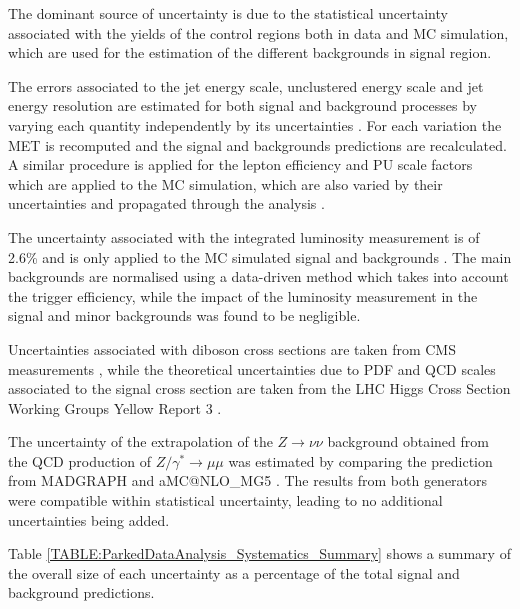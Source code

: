 
The dominant source of uncertainty is due to the statistical uncertainty associated with the yields of the control regions both in data and \gls{MC} simulation, which are used for the estimation of the different backgrounds in signal region. 

The errors associated to the jet energy scale, unclustered energy scale and jet energy resolution are estimated for both signal and background processes by varying each quantity independently by its uncertainties \cite{ARTICLE:CMSDeterminationJetEnergyCalibration}. For each variation the \gls{MET} is recomputed and the signal and backgrounds predictions are recalculated. A similar procedure is applied for the lepton efficiency and \gls{PU} scale factors which are applied to the \gls{MC} simulation, which are also varied by their uncertainties and propagated through the analysis \cite{ARTICLE:CMSMuonReconstruction7TeV,ARTICLE:CMSElectronReconstruction8TeV}.

The uncertainty associated with the integrated luminosity measurement is of 2.6\% and is only applied to the \gls{MC} simulated signal and backgrounds \cite{ARTICLE:CMSLuminosityBasedonPixelClusterCounting}. The main backgrounds are normalised using a data-driven method which takes into account the trigger efficiency, while the impact of the luminosity measurement in the signal and minor backgrounds was found to be negligible.

Uncertainties associated with diboson cross sections are taken from \gls{CMS} measurements \cite{ARTICLE:CMSMeasurmentOfWWandZZxsec}, while the theoretical uncertainties due to \gls{PDF} and \gls{QCD} scales associated to the signal cross section are taken from the \gls{LHC} Higgs Cross Section Working Groups Yellow Report 3 \cite{ARTICLE:HandbookofLHCHiggsCrossSectionsInclusiveObservables,ARTICLE:HandbookofLHCHiggsCrossSectionsDifferentialDistributions}.

The uncertainty of the extrapolation of the  $Z\rightarrow\nu\nu$ background obtained from the \gls{QCD} production of $Z/\gamma^{*}\rightarrow\mu\mu$ was estimated by comparing the prediction from \textsc{MADGRAPH} and a\textsc{MC@NLO\_MG5} \cite{ARTICLE:aMCatNLO}. The results from both generators were compatible within statistical uncertainty, leading to no additional uncertainties being added. 

Table \ref{TABLE:ParkedDataAnalysis_Systematics_Summary} shows a summary of the overall size of each uncertainty as a percentage of the total signal and background predictions.

